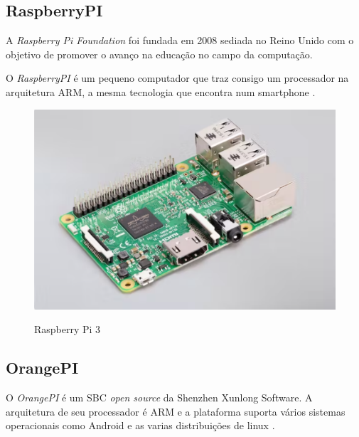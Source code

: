 \subsection{RaspberryPI}

A \textit{Raspberry Pi Foundation} foi fundada em 2008 sediada no Reino Unido com o objetivo de promover o avanço na educação no campo da computação. \cite{rasp}

O \textit{RaspberryPI} é um pequeno computador que traz consigo um processador na arquitetura ARM, a mesma tecnologia que encontra num smartphone \cite{rasp}.

\begin{figure}[!htbp]
  \caption{Raspberry Pi 3}
  \includegraphics[scale=0.4]{images/rasp.png}
  \label{figura:rasp}
\end{figure}

\subsection{OrangePI}

O \textit{OrangePI} é um SBC \textit{open source} da Shenzhen Xunlong Software. A arquitetura de seu processador é ARM e a plataforma suporta vários sistemas operacionais como Android e as varias distribuições de linux \cite{orangepi}.

